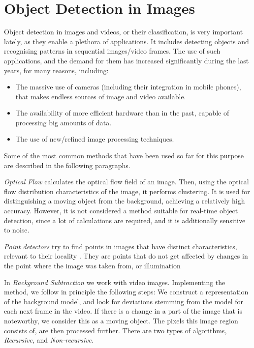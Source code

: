 \documentclass[final,12p,times]{elsarticle}
\begin{document}
\section{Object Detection in Images}
\label{sec:1}
Object detection in images and videos, or their classification, is very important lately, as they enable a plethora of applications.
It includes detecting objects and recognising patterns in sequential images/video frames. 
The use of such applications, and the demand for them has increased significantly during the last years, for many reasons, including:
\begin{itemize}
\item The massive use of cameras (including their integration in mobile phones), that makes endless sources of image and video available.
\item The availability of more efficient hardware than in the past, capable of processing big amounts of data.
\item The use of new/refined image processing techniques.
\end{itemize}

Some of the most common methods that have been used so far for this purpose are described in the following paragraphs.

\emph{Optical Flow} \cite{chauhan2013moving} calculates the optical flow field of an image. Then, using the optical flow distribution characteristics of 
the image, it performs clustering. It is used for distinguishing a moving object from the background, achieving a relatively high accuracy.
However, it is not considered a method suitable for real-time object detection, since a lot of calculations are required, and it is additionally 
sensitive to noise.

\emph{Point detectors} try to find points in images that have distinct characteristics, relevant to their locality \cite{lee2009histogram} \cite{rout2013survey}. They are 
points that do not get affected by changes in the point where the image was taken from, or illumination

In \emph{Background Subtraction} we work with video images. Implementing the method, we follow in principle the 
following steps: We construct a representation of the background model, and look for deviations stemming
from the model for each next frame in the video. If there is a change in a part of the image that is noteworthy, we consider this as a 
moving object. The pixels this image region consists of, are then processed further.
There are two types of algorithms, \emph{Recursive}, and \emph{Non-recursive}.
\end{document}
